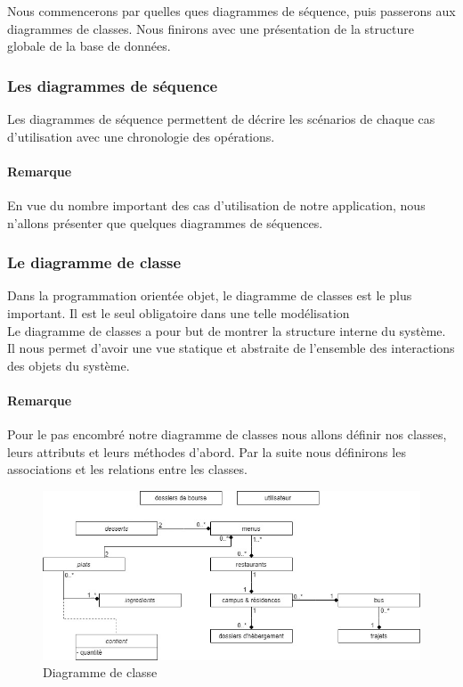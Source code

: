 Nous commencerons par quelles ques diagrammes de séquence, puis passerons aux diagrammes de classes. Nous finirons avec une présentation de la structure globale de la base de données.\\

\subsubsection{Les diagrammes de séquence}
Les diagrammes de séquence permettent de décrire les scénarios de chaque cas d'utilisation avec une chronologie des opérations.

\paragraph*{Remarque} En vue du nombre important des cas d'utilisation de notre application, nous n'allons présenter que quelques diagrammes de séquences.\\

\subsubsection{Le diagramme de classe}
Dans la programmation orientée objet, le diagramme de classes est le plus important. Il est le seul obligatoire dans une telle modélisation\\

Le diagramme de classes a pour but de montrer la structure interne du système. Il nous permet d'avoir une vue statique et abstraite de l'ensemble des interactions des objets du système.\\

\paragraph*{Remarque} Pour le pas encombré notre diagramme de classes nous allons définir nos classes, leurs attributs et leurs méthodes d'abord. Par la suite nous définirons les associations et les relations entre les classes.\\



\begin{figure}[H]
    \centering
    \includegraphics[scale=0.55]{ACR/Diagrammes/class.jpg}
    \caption{Diagramme de classe}
\end{figure}

